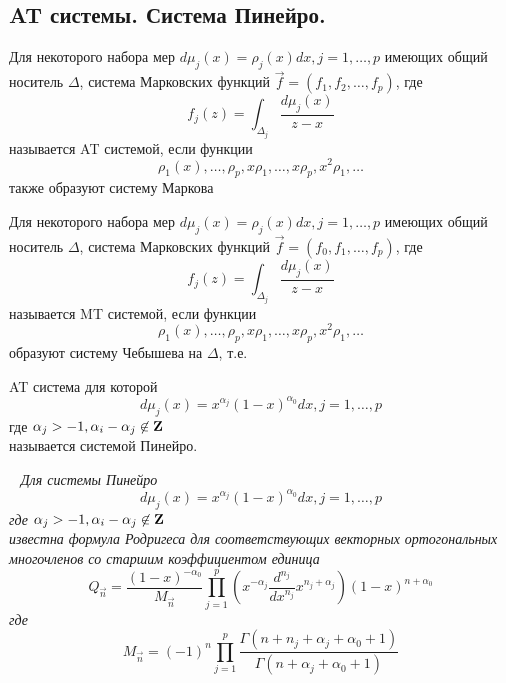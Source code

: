 \subsection{AT системы. Система Пинейро.}
\begin{defi}
Для некоторого набора мер $d\mu_j(x)=\rho_j (x)dx, j=1,\ldots,p$
имеющих общий носитель ${\Delta}$, система Марковских функций
$\overrightarrow{f}=(f_1,f_2,\ldots,f_p)$, где
$$
 f_j(z)
=\int_{\Delta_j}{\displaystyle\frac{d\mu_j(x)}{z-x}}
$$
называется AT системой, если функции
$$
\rho_1(x),\ldots,\rho_p,x \rho_1,\ldots, x\rho_p, x^2\rho_1,
\ldots
$$
также образуют систему Маркова
\end{defi}

\begin{defi}
Для некоторого набора мер $d\mu_j(x)=\rho_j (x)dx, j=1,\ldots,p$
имеющих общий носитель ${\Delta}$, система Марковских функций
$\overrightarrow{f}=(f_0,f_1,\ldots,f_p)$, где
$$
 f_j(z)
=\int_{\Delta_j}{\displaystyle\frac{d\mu_j(x)}{z-x}}
$$
называется MT системой, если функции
$$
\rho_1(x),\ldots,\rho_p,x \rho_1,\ldots, x\rho_p, x^2\rho_1,
\ldots
$$
образуют систему Чебышева на $\Delta$, т.е.
\end{defi}

\begin{defi}
AT система для которой
$$
d\mu_j(x)=x^{\alpha_j}(1-x)^{\alpha_0}dx, j=1,\ldots,p
$$
где $\alpha_j>-1, \alpha_i-\alpha_j \not \in \bf Z \rm$ \\
называется системой Пинейро.
\end{defi}


\begin{teor} \rm ~\cite{AptekaaKaliaJvaniseg} \it
Для системы Пинейро
$$
d\mu_j(x)=x^{\alpha_j}(1-x)^{\alpha_0}dx, j=1,\ldots,p
$$
где $\alpha_j>-1, \alpha_i-\alpha_j \not \in \bf Z \rm$ \\
известна формула Родригеса для соответствующих векторных
ортогональных многочленов со старшим коэффициентом единица
$$
Q_{\overrightarrow{n}}=\frac{(1-x)^{-\alpha_0}}{M_{\overrightarrow{n}}}
\prod_{j=1}^{p} { \left( x^{-\alpha_j} \frac{d^{n_j}} {dx^{n_j}}
x^{n_j+\alpha_j} \right) (1-x)^{n+\alpha_0}}
$$
где
$$
M_{\overrightarrow{n}}=(-1)^{n} \prod_{j=1}^{p} {
\frac{\Gamma(n+n_j+\alpha_j+\alpha_0+1)}{\Gamma(n+\alpha_j+\alpha_0+1)}}
$$
\end{teor}

